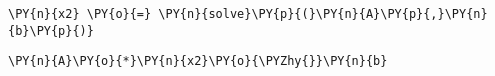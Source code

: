 {\par%
\vspace{-1\baselineskip}%
}%
\begin{notebookcell}[85]%
\begin{addmargin}[\cellleftmargin]{0em}%
{\smaller%
\par%
%
\vspace{-1\smallerfontscale}%
\begin{Verbatim}[commandchars=\\\{\}]
\PY{n}{x2} \PY{o}{=} \PY{n}{solve}\PY{p}{(}\PY{n}{A}\PY{p}{,}\PY{n}{b}\PY{p}{)}
\end{Verbatim}
%
\par%
\vspace{-1\smallerfontscale}}%
\end{addmargin}
\end{notebookcell}



{\par%
\vspace{-1\baselineskip}%
}%
\begin{notebookcell}[86]%
\begin{addmargin}[\cellleftmargin]{0em}%
{\smaller%
\par%
%
\vspace{-1\smallerfontscale}%
\begin{Verbatim}[commandchars=\\\{\}]
\PY{n}{A}\PY{o}{*}\PY{n}{x2}\PY{o}{\PYZhy{}}\PY{n}{b}
\end{Verbatim}
%
\par%
\vspace{-1\smallerfontscale}}%
\end{addmargin}
\end{notebookcell}

\par\vspace{1\smallerfontscale}%
    
